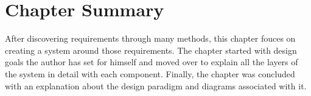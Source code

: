 \section{Chapter Summary}

After discovering requirements through many methods, this chapter fouces on creating a system around those requirements. The chapter started with design goals the author has set for himself and moved over to explain all the layers of the system in detail with each component. Finally, the chapter was concluded with an explanation about the design paradigm and diagrams associated with it.

